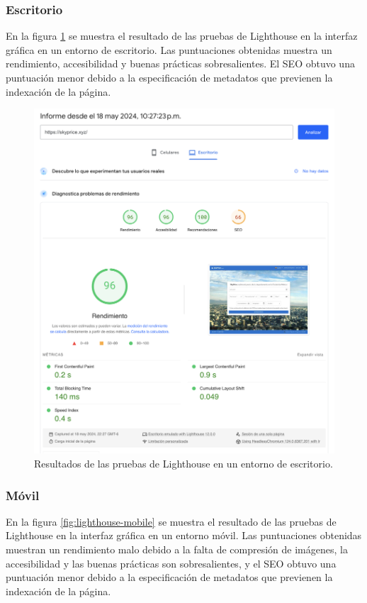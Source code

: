 \subsubsection{Escritorio}
En la figura \ref{fig:lighthouse-desktop} se muestra el resultado de las pruebas
de Lighthouse en la interfaz gráfica en un entorno de escritorio. Las puntuaciones
obtenidas muestra un rendimiento, accesibilidad y buenas prácticas sobresalientes.
El SEO obtuvo una puntuación menor debido a la especificación de metadatos que
previenen la indexación de la página.

\begin{figure}[H]
    \centering
    \includegraphics[width=1.0\textwidth]{imagenes/05-implementacion/pruebas/lighthouse-desktop.png}
    \caption{Resultados de las pruebas de Lighthouse en un entorno de escritorio.}
    \label{fig:lighthouse-desktop}
\end{figure}

\subsubsection{Móvil}
En la figura \ref{fig:lighthouse-mobile} se muestra el resultado de las pruebas
de Lighthouse en la interfaz gráfica en un entorno móvil. Las puntuaciones obtenidas
muestran un rendimiento malo debido a la falta de compresión de imágenes, la
accesibilidad y las buenas prácticas son sobresalientes, y el SEO obtuvo una puntuación
menor debido a la especificación de metadatos que previenen la indexación de la página.

